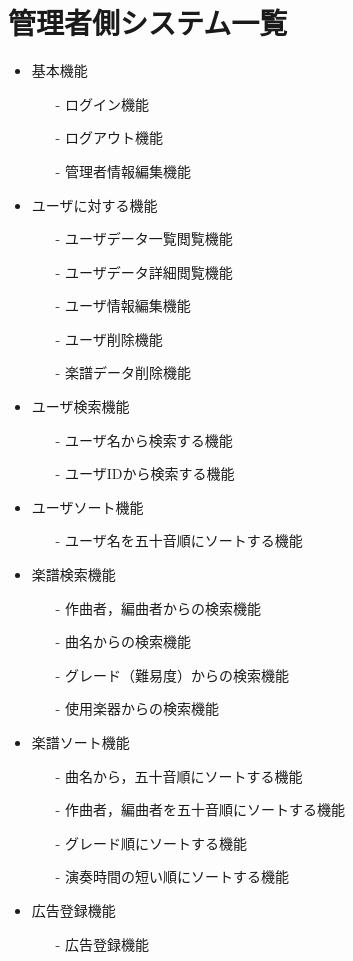 \clearpage

\section{管理者側システム一覧}
\begin{itemize}
    \item 基本機能
    \begin{enumerate}
        \item[-] ログイン機能
        \item[-] ログアウト機能
        \item[-] 管理者情報編集機能
    \end{enumerate}
    \item ユーザに対する機能
    \begin{enumerate}
        \item[-] ユーザデータ一覧閲覧機能
        \item[-] ユーザデータ詳細閲覧機能 
        \item[-] ユーザ情報編集機能
        \item[-] ユーザ削除機能
        \item[-] 楽譜データ削除機能
    \end{enumerate}
    \item ユーザ検索機能
    \begin{enumerate}
        \item[-] ユーザ名から検索する機能
        \item[-] ユーザIDから検索する機能
    \end{enumerate}
    \item ユーザソート機能
    \begin{enumerate}
        \item[-] ユーザ名を五十音順にソートする機能
    \end{enumerate}
    \item 楽譜検索機能
    \begin{enumerate}
        \item[-] 作曲者，編曲者からの検索機能
        \item[-] 曲名からの検索機能
        \item[-] グレード（難易度）からの検索機能
        \item[-] 使用楽器からの検索機能
    \end{enumerate}
    \item 楽譜ソート機能
    \begin{enumerate}
        \item[-] 曲名から，五十音順にソートする機能
        \item[-] 作曲者，編曲者を五十音順にソートする機能
        \item[-] グレード順にソートする機能
        \item[-] 演奏時間の短い順にソートする機能
    \end{enumerate}
    \item 広告登録機能
    \begin{enumerate}
        \item[-] 広告登録機能
    \end{enumerate}
\end{itemize}